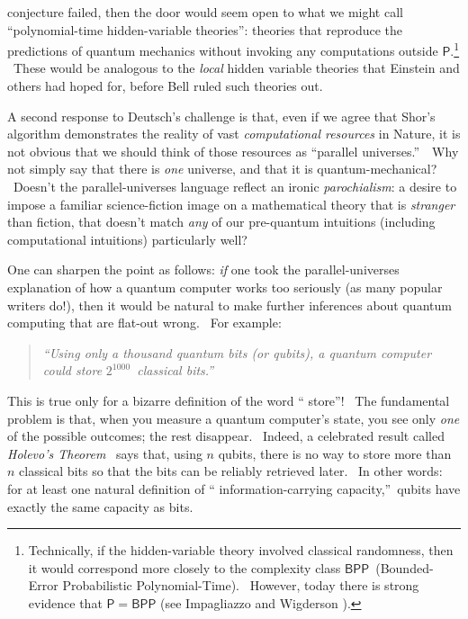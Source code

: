 \documentclass[12pt,onecolumn]{article}%
\begin{document}
conjecture failed, then the door would seem open to what we might call
\textquotedblleft polynomial-time hidden-variable theories\textquotedblright:
theories that reproduce the predictions of quantum mechanics without invoking
any computations outside $\mathsf{P}$.\footnote{Technically, if the
hidden-variable theory involved classical randomness, then it would correspond
more closely to the complexity class $\mathsf{BPP}$\ (Bounded-Error
Probabilistic Polynomial-Time). \ However, today there is strong evidence that
$\mathsf{P}=\mathsf{BPP}$ (see Impagliazzo and Wigderson \cite{iw}).} \ These
would be analogous to the \textit{local} hidden variable theories that
Einstein and others had hoped for, before Bell ruled such theories out.

A second response to Deutsch's challenge is that, even if we agree that Shor's
algorithm demonstrates the reality of vast \textit{computational resources} in
Nature, it is not obvious that we should think of those resources as
\textquotedblleft parallel universes.\textquotedblright\ \ Why not simply say
that there is \textit{one} universe, and that it is quantum-mechanical?
\ Doesn't the parallel-universes language reflect an ironic
\textit{parochialism}: a desire to impose a familiar science-fiction image on
a mathematical theory that is \textit{stranger} than fiction, that doesn't
match \textit{any} of our pre-quantum intuitions (including computational
intuitions) particularly well?

One can sharpen the point as follows: \textit{if} one took the
parallel-universes explanation of how a quantum computer works too seriously
(as many popular writers do!), then it would be natural to make further
inferences about quantum computing that are flat-out wrong. \ For example:

\begin{quotation}
\noindent\textit{\textquotedblleft Using only a thousand quantum bits (or
qubits), a quantum computer could store }$2^{1000}$\textit{\ classical
bits.\textquotedblright}
\end{quotation}

This is true only for a bizarre definition of the word \textquotedblleft
store\textquotedblright! \ The fundamental problem is that, when you measure a
quantum computer's state, you see only \textit{one} of the possible outcomes;
the rest disappear. \ Indeed, a celebrated result called \textit{Holevo's
Theorem} \cite{holevo}\ says that, using $n$ qubits, there is no way to store
more than $n$ classical bits so that the bits can be reliably retrieved later.
\ In other words: for at least one natural definition of \textquotedblleft
information-carrying capacity,\textquotedblright\ qubits have exactly the same
capacity as bits.
\end{document}
